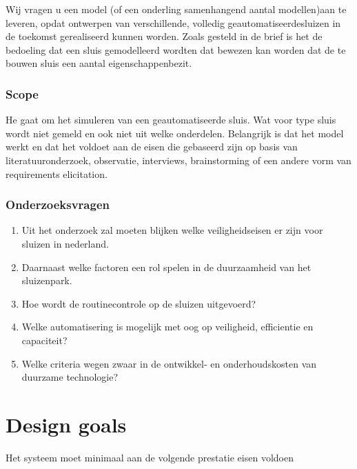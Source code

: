 Wij vragen u een model (of een onderling samenhangend aantal modellen)aan  te  leveren,  opdat  ontwerpen  van  verschillende,  volledig  geautomatiseerdesluizen in de toekomst gerealiseerd kunnen worden. 
Zoals  gesteld  in  de  brief  is  het  de  bedoeling  dat  een  sluis  gemodelleerd  wordten  dat  bewezen  kan  worden  dat  de  te  bouwen  sluis  een  aantal  eigenschappenbezit.  

\subsubsection{Scope}

He gaat om het simuleren van een geautomatiseerde sluis. Wat voor type sluis wordt niet gemeld en ook niet uit welke onderdelen. Belangrijk is dat het model werkt en dat het voldoet aan de eisen die gebaseerd zijn op basis van literatuuronderzoek, observatie, interviews, brainstorming of een andere vorm van requirements elicitation.

\subsubsection{Onderzoeksvragen }






\begin{enumerate}
	\item Uit het onderzoek zal moeten blijken welke veiligheidseisen er zijn voor sluizen in nederland. 
	\item Daarnaast welke factoren een rol spelen in de duurzaamheid van het sluizenpark.  
	\item Hoe wordt de routinecontrole op de sluizen uitgevoerd?  
	\item Welke automatisering is mogelijk met oog op veiligheid, efficientie en capaciteit?  
	\item Welke criteria wegen zwaar in de ontwikkel- en onderhoudskosten van duurzame technologie?
\end{enumerate}



\section{Design goals}
Het systeem moet minimaal aan de volgende prestatie eisen voldoen 

